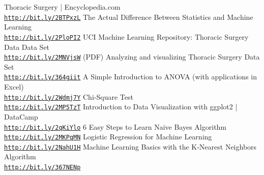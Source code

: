 \documentclass[a4paper, 11pt, oneside]{article} %
\begin{document}
\newpage
 \begin{thebibliography}{10}


Thoracic Surgery | Encyclopedia.com
\\\texttt{\url{http://bit.ly/2BTPxzL}}
The Actual Difference Between Statistics and Machine Learning
\\\texttt{\url{http://bit.ly/2PloPI2}}
UCI Machine Learning Repository: Thoracic Surgery Data Data Set
\\\texttt{\url{http://bit.ly/2MNVjsW}}
(PDF) Analyzing and visualizing Thoracic Surgery Data Set
\\\texttt{\url{http://bit.ly/364giit}}
A Simple Introduction to ANOVA (with applications in Excel)
\\\texttt{\url{http://bit.ly/2Wdmj7Y}}
Chi-Square Test
\\\texttt{\url{http://bit.ly/2MP5TzT}}
Introduction to Data Visualization with ggplot2 | DataCamp
\\\texttt{\url{http://bit.ly/2qKiYlo}}
6 Easy Steps to Learn Naive Bayes Algorithm 
\\\texttt{\url{http://bit.ly/2MKPqMN}}
Logistic Regression for Machine Learning
\\\texttt{\url{http://bit.ly/2NahU1H}}
Machine Learning Basics with the K-Nearest Neighbors Algorithm
\\\texttt{\url{http://bit.ly/367NENp}}

\end{thebibliography}
\end{document}
